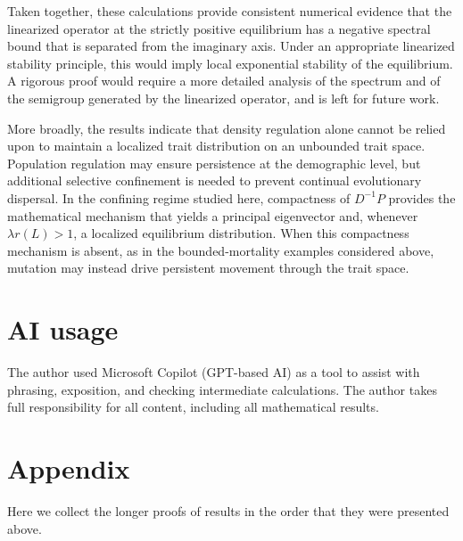 \documentclass[12pt]{article}
\begin{document}
Taken together, these calculations provide consistent numerical evidence
that the linearized operator at the strictly positive equilibrium has a
negative spectral bound that is separated from the imaginary axis. Under
an appropriate linearized stability principle, this would imply local
exponential stability of the equilibrium. A rigorous proof would require
a more detailed analysis of the spectrum and of the semigroup generated
by the linearized operator, and is left for future work.

More broadly, the results indicate that density regulation alone cannot
be relied upon to maintain a localized trait distribution on an
unbounded trait space. Population regulation may ensure persistence at
the demographic level, but additional selective confinement is needed
to prevent continual evolutionary dispersal. In the confining regime
studied here, compactness of $D^{-1}P$ provides the mathematical
mechanism that yields a principal eigenvector and, whenever
$\lambda r(L)>1$, a localized equilibrium distribution. When this
compactness mechanism is absent, as in the bounded-mortality examples
considered above, mutation may instead drive persistent movement
through the trait space.

\section{AI usage}

The author used Microsoft Copilot (GPT-based AI) as a tool to assist
with phrasing, exposition, and checking intermediate calculations. The
author takes full responsibility for all content, including all
mathematical results.

\section{Appendix}
\label{appendix}

Here we collect the longer proofs of results in the order that they
were presented above.
\end{document}
